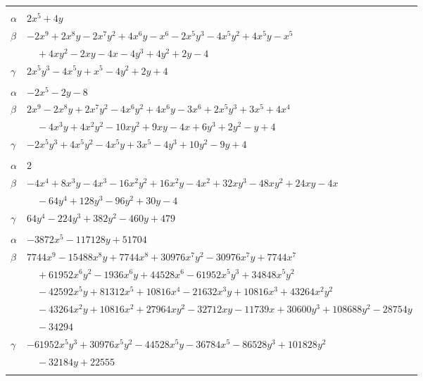 \documentclass[11pt]{article}
\begin{document}
\begin{longtable}{@{}ll@{}}
\addlinespace[3pt]
\multicolumn{2}{@{}l}{$\{i,j\}=\{2,35\}$, $k_{ij}=2^{3}$}\\
$\alpha$ & $2x^{5}+4y$\\
$\beta$ & $-2x^{9}+2x^{8}y-2x^{7}y^{2}+4x^{6}y-x^{6}-2x^{5}y^{3}-4x^{5}y^{2}+4x^{5}y-x^{5}$\\
 & $\quad +4xy^{2}-2xy-4x-4y^{3}+4y^{2}+2y-4$\\
$\gamma$ & $2x^{5}y^{3}-4x^{5}y+x^{5}-4y^{2}+2y+4$\\
\addlinespace[3pt]
\multicolumn{2}{@{}l}{$\{i,j\}=\{2,36\}$, $k_{ij}=2^{4}$}\\
$\alpha$ & $-2x^{5}-2y-8$\\
$\beta$ & $2x^{9}-2x^{8}y+2x^{7}y^{2}-4x^{6}y^{2}+4x^{6}y-3x^{6}+2x^{5}y^{3}+3x^{5}+4x^{4}$\\
 & $\quad -4x^{3}y+4x^{2}y^{2}-10xy^{2}+9xy-4x+6y^{3}+2y^{2}-y+4$\\
$\gamma$ & $-2x^{5}y^{3}+4x^{5}y^{2}-4x^{5}y+3x^{5}-4y^{3}+10y^{2}-9y+4$\\
\addlinespace[3pt]
\multicolumn{2}{@{}l}{$\{i,j\}=\{3,5\}$, $k_{ij}=2^{6}\cdot 3\cdot 5$}\\
$\alpha$ & $2$\\
$\beta$ & $-4x^{4}+8x^{3}y-4x^{3}-16x^{2}y^{2}+16x^{2}y-4x^{2}+32xy^{3}-48xy^{2}+24xy-4x$\\
 & $\quad -64y^{4}+128y^{3}-96y^{2}+30y-4$\\
$\gamma$ & $64y^{4}-224y^{3}+382y^{2}-460y+479$\\
\addlinespace[3pt]
\multicolumn{2}{@{}l}{$\{i,j\}=\{3,18\}$, $k_{ij}=3\cdot 5\cdot 7^{3}$}\\
$\alpha$ & $-3872x^{5}-117128y+51704$\\
$\beta$ & $7744x^{9}-15488x^{8}y+7744x^{8}+30976x^{7}y^{2}-30976x^{7}y+7744x^{7}$\\
 & $\quad +61952x^{6}y^{2}-1936x^{6}y+44528x^{6}-61952x^{5}y^{3}+34848x^{5}y^{2}$\\
 & $\quad -42592x^{5}y+81312x^{5}+10816x^{4}-21632x^{3}y+10816x^{3}+43264x^{2}y^{2}$\\
 & $\quad -43264x^{2}y+10816x^{2}+27964xy^{2}-32712xy-11739x+30600y^{3}+108688y^{2}-28754y$\\
 & $\quad -34294$\\
$\gamma$ & $-61952x^{5}y^{3}+30976x^{5}y^{2}-44528x^{5}y-36784x^{5}-86528y^{3}+101828y^{2}$\\
 & $\quad -32184y+22555$\\
\addlinespace[3pt]
\multicolumn{2}{@{}l}{$\{i,j\}=\{3,25\}$, $k_{ij}=2^{4}$}\\

\end{longtable}
\end{document}
